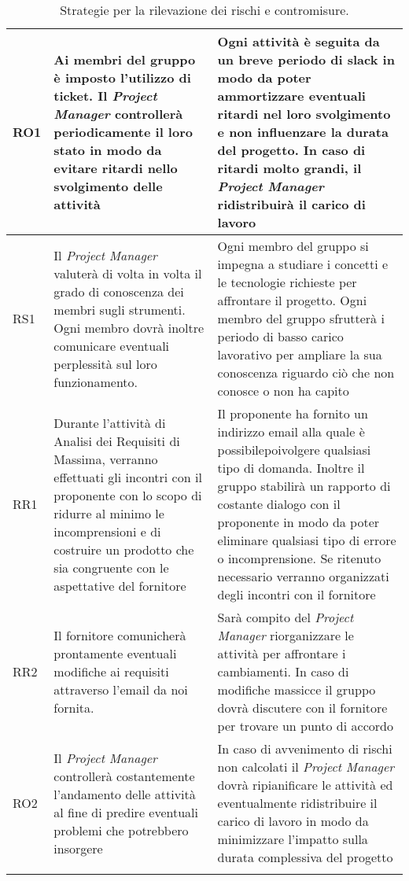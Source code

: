 \begin{longtable}[H]{|l|C{5cm}|C{7cm}|}
		\hline
		RO1     & Ai membri del gruppo è imposto l'utilizzo di ticket. Il \emph{Project Manager} controllerà periodicamente il loro stato in modo da evitare ritardi nello svolgimento delle attività & Ogni attività è seguita da un breve periodo di slack in modo da poter ammortizzare eventuali ritardi nel loro svolgimento e non influenzare la durata del progetto. In caso di ritardi molto grandi, il \emph{Project Manager} ridistribuirà il carico di lavoro\\  
		\hline
		RS1     & Il \emph{Project Manager} valuterà di volta in volta il grado di conoscenza dei membri sugli strumenti. Ogni membro dovrà inoltre comunicare eventuali perplessità sul loro funzionamento. & Ogni membro del gruppo si impegna a studiare i concetti e le tecnologie richieste per affrontare il progetto. Ogni membro del gruppo sfrutterà i periodo di basso carico lavorativo per ampliare la sua conoscenza riguardo ciò che non conosce o non ha capito\\
		\hline
		RR1     & Durante l'attività di Analisi dei Requisiti di Massima, verranno effettuati gli incontri con il proponente con lo scopo di ridurre al minimo le incomprensioni e di costruire un prodotto che sia congruente con le aspettative del fornitore  & Il proponente ha fornito un indirizzo email alla quale è possibilepoivolgere qualsiasi tipo di domanda. Inoltre il gruppo stabilirà un rapporto di costante dialogo con il proponente in modo da poter eliminare qualsiasi tipo di errore o incomprensione. Se ritenuto necessario verranno organizzati degli incontri con il fornitore\\
		\hline
		RR2 & Il fornitore comunicherà prontamente eventuali modifiche ai requisiti attraverso l'email da noi fornita. & Sarà compito del \emph{Project Manager} riorganizzare le attività per affrontare i cambiamenti. In caso di modifiche massicce il gruppo dovrà discutere con il fornitore per trovare un punto di accordo\\
		\hline                                                                                                                           
		RO2 & Il \emph{Project Manager} controllerà costantemente l'andamento delle attività al fine di predire eventuali problemi che potrebbero insorgere & In caso di avvenimento di rischi non calcolati il \emph{Project Manager} dovrà ripianificare le attività ed eventualmente ridistribuire il carico di lavoro in modo da minimizzare l'impatto sulla durata complessiva del progetto\\
		\hline
		\caption{Strategie per la rilevazione dei rischi e contromisure.}
\end{longtable}





